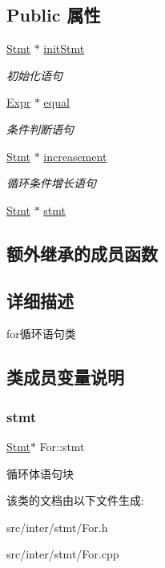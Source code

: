 \subsection*{Public 属性}
\begin{DoxyCompactItemize}
\item 
\mbox{\label{class_for_a056889fe255686012e6a9197c2d514e7}} 
\hyperlink{class_stmt}{Stmt} $\ast$ \hyperlink{class_for_a056889fe255686012e6a9197c2d514e7}{init\+Stmt}
\begin{DoxyCompactList}\small\item\em 初始化语句 \end{DoxyCompactList}\item 
\mbox{\label{class_for_a215e09b14cddca31190dc69cd783d886}} 
\hyperlink{class_expr}{Expr} $\ast$ \hyperlink{class_for_a215e09b14cddca31190dc69cd783d886}{equal}
\begin{DoxyCompactList}\small\item\em 条件判断语句 \end{DoxyCompactList}\item 
\mbox{\label{class_for_a2d0ace8af086310ef5a11d9641dc81e6}} 
\hyperlink{class_stmt}{Stmt} $\ast$ \hyperlink{class_for_a2d0ace8af086310ef5a11d9641dc81e6}{increasement}
\begin{DoxyCompactList}\small\item\em 循环条件增长语句 \end{DoxyCompactList}\item 
\hyperlink{class_stmt}{Stmt} $\ast$ \hyperlink{class_for_af269abab55eae120cccbd1c76b0c5011}{stmt}
\end{DoxyCompactItemize}
\subsection*{额外继承的成员函数}


\subsection{详细描述}
for循环语句类 

\subsection{类成员变量说明}
\mbox{\label{class_for_af269abab55eae120cccbd1c76b0c5011}} 
\subsubsection{\texorpdfstring{stmt}{stmt}}
{\footnotesize\ttfamily \hyperlink{class_stmt}{Stmt}$\ast$ For\+::stmt}

循环体语句块 

该类的文档由以下文件生成\+:\begin{DoxyCompactItemize}
\item 
src/inter/stmt/For.\+h\item 
src/inter/stmt/For.\+cpp\end{DoxyCompactItemize}
